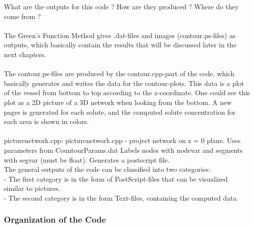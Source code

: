 What are the outputs for this code ? How are they produced ? Where do they come from ?
\\
\\The Green's Function Method gives .dat-files and images (contour.ps-files) as outputs, which basically contain the results that will be discussed later in the next chapters.
\\
\\The contour.ps-files are produced by the contour.cpp-part of the code, which basically generates and writes the data for the contour-plots. This data is a plot of the vessel from bottom to top according to the z-coordinate. One could see this plot as a 2D picture of a 3D network when looking from the bottom. A new pages is generated for each solute, and the computed solute concentration for each area is shown in colors.
\\
\\picturenetwork.cpp: picturenetwork.cpp - project network on z = 0 plane.
Uses parameters from CountourParams.dat
Labels nodes with nodevar and segments with segvar (must be float).
Generates a postscript file.
\\
The general outputs of the code can be classified into two categories:
\\- The first category is in the form of PostScript-files that can be visualized similar to pictures.
\\- The second category is in the form Text-files, containing the computed data.
\\

\subsubsection*{Organization of the Code}

